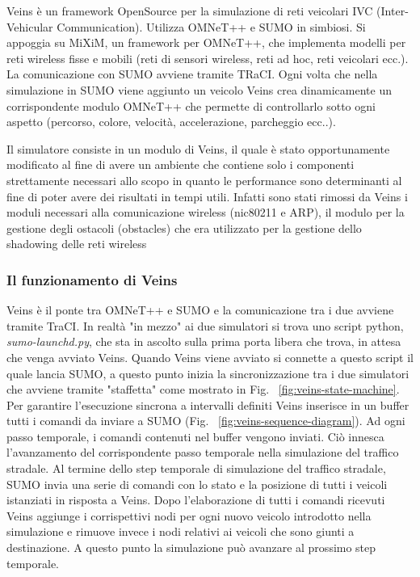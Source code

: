 Veins è un framework OpenSource per la simulazione di reti veicolari IVC (Inter-Vehicular Communication). Utilizza OMNeT++ e SUMO in simbiosi. Si appoggia su MiXiM, un framework per OMNeT++, che implementa modelli per reti wireless fisse e mobili (reti di sensori wireless, reti ad hoc, reti veicolari ecc.). La comunicazione con SUMO avviene tramite TRaCI. Ogni volta che nella simulazione in SUMO viene aggiunto un veicolo Veins crea dinamicamente un corrispondente modulo OMNeT++ che permette di controllarlo sotto ogni aspetto (percorso, colore, velocità, accelerazione, parcheggio ecc..).

Il simulatore consiste in un modulo di Veins, il quale è stato opportunamente modificato al fine di avere un ambiente che contiene solo i componenti strettamente necessari allo scopo in quanto le performance sono determinanti al fine di poter avere dei risultati in tempi utili. Infatti sono stati rimossi da Veins i moduli necessari alla comunicazione wireless (nic80211 e ARP), il modulo per la gestione degli ostacoli (obstacles) che era utilizzato per la gestione dello shadowing delle reti wireless

\subsubsection{Il funzionamento di Veins}\label{subsubsec:veins-func}

Veins è il ponte tra OMNeT++ e SUMO e la comunicazione tra i due avviene tramite TraCI. In realtà "in mezzo" ai due simulatori si trova uno script python, \emph{sumo-launchd.py}, che sta in ascolto sulla prima porta libera che trova, in attesa che venga avviato Veins. Quando Veins viene avviato si connette a questo script il quale lancia SUMO, a questo punto inizia la sincronizzazione tra i due simulatori che avviene tramite "staffetta" come mostrato in Fig. ~\ref{fig:veins-state-machine}. Per garantire l'esecuzione sincrona a intervalli definiti Veins inserisce in un buffer tutti i comandi da inviare a SUMO (Fig.  ~\ref{fig:veins-sequence-diagram}). Ad ogni passo temporale, i comandi contenuti nel buffer vengono inviati. Ciò innesca l'avanzamento del corrispondente passo temporale nella simulazione del traffico stradale. Al termine dello step temporale di simulazione del traffico stradale, SUMO invia una serie di comandi con lo stato e la posizione di tutti i veicoli istanziati in risposta a Veins. Dopo l'elaborazione di tutti i comandi ricevuti Veins aggiunge i corrispettivi nodi per ogni nuovo veicolo introdotto nella simulazione e rimuove invece i nodi relativi ai veicoli che sono giunti a destinazione. A questo punto la simulazione può avanzare al prossimo step temporale.

